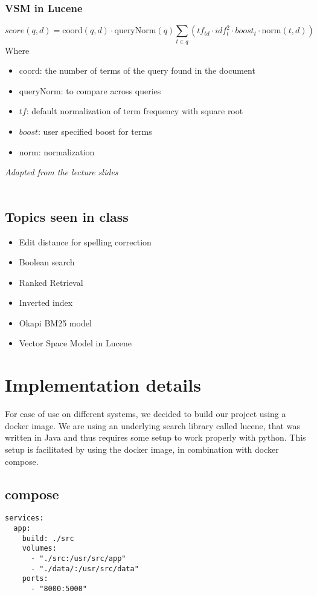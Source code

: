 \documentclass{article}
\begin{document}
\subsubsection{VSM in Lucene}
$$score(q,d) = \text{coord}(q,d) \cdot \text{queryNorm}(q) \displaystyle \sum_{t\in q}\left(tf_{td} \cdot idf_t^2 \cdot boost_t \cdot \text{norm}(t,d)\right)$$
Where \begin{itemize}
    \item coord: the number of terms of the query found in the document
    \item queryNorm: to compare across queries
    \item $tf$: default normalization of term frequency with square root
    \item $boost$: user specified boost for terms
    \item norm: normalization
\end{itemize}
\small
\textit{Adapted from the lecture slides}\\~\\
\normalsize
\subsection{Topics seen in class}
\begin{itemize}
    \item Edit distance for spelling correction
    \item Boolean search
    \item Ranked Retrieval
    \item Inverted index %
    \item Okapi BM25 model
    \item Vector Space Model in Lucene
\end{itemize}

\section{Implementation details}
For ease of use on different systems, we decided to build our project
using a docker image. We are using an underlying search library called lucene,
that was written in Java and thus requires some setup to work properly with
python. This setup is facilitated by using the docker image,
in combination with docker compose.
\subsection{compose}
\begin{lstlisting}
services:
  app:
    build: ./src
    volumes:
      - "./src:/usr/src/app"
      - "./data/:/usr/src/data"
    ports:
      - "8000:5000"
\end{lstlisting}
\end{document}
